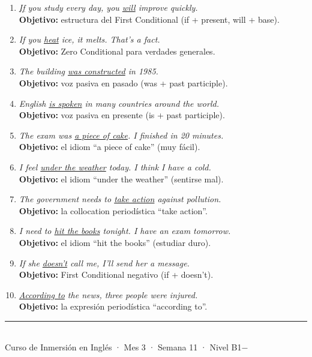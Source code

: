 \documentclass[12pt,a4paper]{article}
\begin{document}
\begin{cajamineria}

\begin{enumerate}[leftmargin=1.2cm]
  \item \textit{\underline{If} you study every day, you \underline{will} improve quickly.}\\
    {\small\textbf{Objetivo:} estructura del First Conditional (if + present, will + base).}

  \item \textit{If you \underline{heat} ice, it melts. That's a fact.}\\
    {\small\textbf{Objetivo:} Zero Conditional para verdades generales.}

  \item \textit{The building \underline{was constructed} in 1985.}\\
    {\small\textbf{Objetivo:} voz pasiva en pasado (was + past participle).}

  \item \textit{English \underline{is spoken} in many countries around the world.}\\
    {\small\textbf{Objetivo:} voz pasiva en presente (is + past participle).}

  \item \textit{The exam was \underline{a piece of cake}. I finished in 20 minutes.}\\
    {\small\textbf{Objetivo:} el idiom ``a piece of cake'' (muy fácil).}

  \item \textit{I feel \underline{under the weather} today. I think I have a cold.}\\
    {\small\textbf{Objetivo:} el idiom ``under the weather'' (sentirse mal).}

  \item \textit{The government needs to \underline{take action} against pollution.}\\
    {\small\textbf{Objetivo:} la collocation periodística ``take action''.}

  \item \textit{I need to \underline{hit the books} tonight. I have an exam tomorrow.}\\
    {\small\textbf{Objetivo:} el idiom ``hit the books'' (estudiar duro).}

  \item \textit{If she \underline{doesn't} call me, I'll send her a message.}\\
    {\small\textbf{Objetivo:} First Conditional negativo (if + doesn't).}

  \item \textit{\underline{According to} the news, three people were injured.}\\
    {\small\textbf{Objetivo:} la expresión periodística ``according to''.}
\end{enumerate}
\end{cajamineria}

\vfill
\begin{center}
\rule{0.5\textwidth}{0.5pt}\\[0.3cm]
{\small\color{grissuave} Curso de Inmersión en Inglés · Mes 3 · Semana 11 · Nivel B1$-$}
\end{center}
\end{document}

